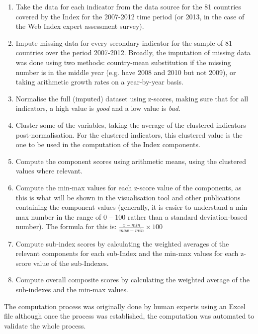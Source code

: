 \documentclass{llncs}
\begin{document}
\begin{enumerate}

\item Take the data for each indicator from the data source for the 81 countries covered by the Index for the 2007-2012 time period (or 2013, in the case of the Web Index expert assessment survey).

\item Impute missing data for every secondary indicator for the sample of 81 countries over the period 2007-2012.  
Broadly, the imputation of missing data was done using two methods: country-mean substitution if the missing number is in the middle year (e.g. have 2008 and 2010 but not 2009), or taking arithmetic growth rates on a year-by-year basis. 

\item Normalise the full (imputed) dataset using z-scores, making sure that for all indicators, a high value is \emph{good} and a low value is \emph{bad}.

\item Cluster some of the variables, taking the average of the clustered indicators post-normalisation. For the clustered indicators, this clustered value is the one to be used in the computation of the Index components.

\item Compute the component scores using arithmetic means, using the clustered values where relevant.

\item Compute the min-max values for each z-score value of the components, 
 as this is what will be shown in the visualisation tool and other 
 publications containing the component values (generally, it is easier to understand 
 a min-max number in the range of 0 – 100 rather than a standard deviation-based number). 
 The formula for this is: $\frac{x-min}{max-min}\times{}100$

\item Compute sub-index scores by calculating the weighted averages of the relevant components for each sub-Index and the min-max values for each z-score value of the sub-Indexes.

\item Compute overall composite scores by calculating the weighted average of the sub-indexes and the min-max values.
\end{enumerate}

The computation process was originally done by human experts using an Excel file although
once the process was established, the computation was automated to validate the whole process. 
\end{document}

